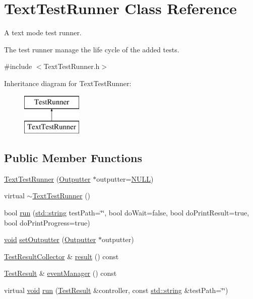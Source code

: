 \hypertarget{class_text_test_runner}{\section{Text\-Test\-Runner Class Reference}
\label{class_text_test_runner}
}


A text mode test runner.

The test runner manage the life cycle of the added tests.  




{\ttfamily \#include $<$Text\-Test\-Runner.\-h$>$}

Inheritance diagram for Text\-Test\-Runner\-:\begin{figure}[H]
\begin{center}
\leavevmode
\includegraphics[height=2.000000cm]{class_text_test_runner}
\end{center}
\end{figure}
\subsection*{Public Member Functions}
\begin{DoxyCompactItemize}
\item 
\hyperlink{class_text_test_runner_ac7b6cba645a3a5e76382fcd40e4f7eb6}{Text\-Test\-Runner} (\hyperlink{class_outputter}{Outputter} $\ast$outputter=\hyperlink{ftobjs_8h_a070d2ce7b6bb7e5c05602aa8c308d0c4}{N\-U\-L\-L})
\item 
virtual \hyperlink{class_text_test_runner_a8105da57dba58aa4319058b03f348693}{$\sim$\-Text\-Test\-Runner} ()
\item 
bool \hyperlink{class_text_test_runner_ad9c38c263202c2bd453b927ba53dcf48}{run} (\hyperlink{glew_8h_ae84541b4f3d8e1ea24ec0f466a8c568b}{std\-::string} test\-Path=\char`\"{}\char`\"{}, bool do\-Wait=false, bool do\-Print\-Result=true, bool do\-Print\-Progress=true)
\item 
\hyperlink{wglew_8h_aeea6e3dfae3acf232096f57d2d57f084}{void} \hyperlink{class_text_test_runner_a9d62d11f3acba355e47d21cb99106117}{set\-Outputter} (\hyperlink{class_outputter}{Outputter} $\ast$outputter)
\item 
\hyperlink{class_test_result_collector}{Test\-Result\-Collector} \& \hyperlink{class_text_test_runner_a7a6cf866d23d621ed35474c8179b9b48}{result} () const 
\item 
\hyperlink{class_test_result}{Test\-Result} \& \hyperlink{class_text_test_runner_afa50f45ea60892db3cf0b128c06a1629}{event\-Manager} () const 
\item 
virtual \hyperlink{wglew_8h_aeea6e3dfae3acf232096f57d2d57f084}{void} \hyperlink{class_text_test_runner_a361eaa340138edf3659a9fcb813c3b5d}{run} (\hyperlink{class_test_result}{Test\-Result} \&controller, const \hyperlink{glew_8h_ae84541b4f3d8e1ea24ec0f466a8c568b}{std\-::string} \&test\-Path=\char`\"{}\char`\"{})
\end{DoxyCompactItemize}
